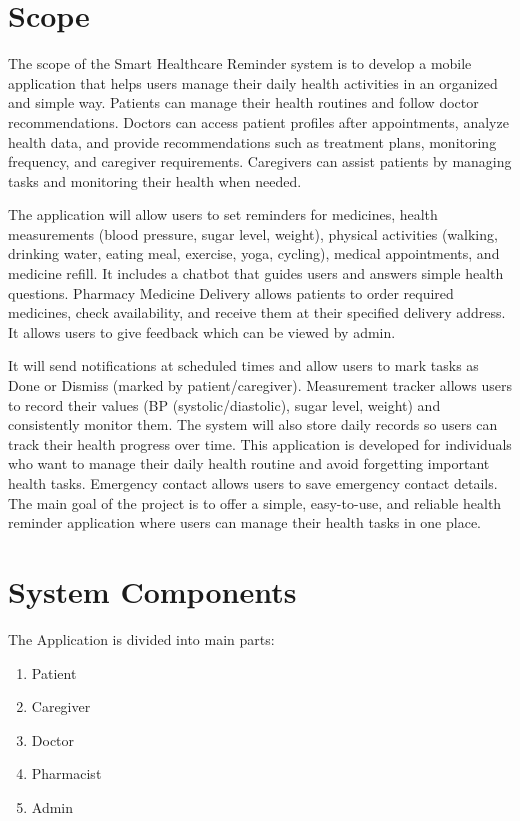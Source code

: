 \section{Scope}
\label{sec:scope}

The scope of the Smart Healthcare Reminder system is to develop a mobile application that helps users manage their daily health activities in an organized and simple way. Patients can manage their health routines and follow doctor recommendations. Doctors can access patient profiles after appointments, analyze health data, and provide recommendations such as treatment plans, monitoring frequency, and caregiver requirements. Caregivers can assist patients by managing tasks and monitoring their health when needed.

The application will allow users to set reminders for medicines, health measurements (blood pressure, sugar level, weight), physical activities (walking, drinking water, eating meal, exercise, yoga, cycling), medical appointments, and medicine refill. It includes a chatbot that guides users and answers simple health questions. Pharmacy Medicine Delivery allows patients to order required medicines, check availability, and receive them at their specified delivery address. It allows users to give feedback which can be viewed by admin.

It will send notifications at scheduled times and allow users to mark tasks as Done or Dismiss (marked by patient/caregiver). Measurement tracker allows users to record their values (BP (systolic/diastolic), sugar level, weight) and consistently monitor them. The system will also store daily records so users can track their health progress over time. This application is developed for individuals who want to manage their daily health routine and avoid forgetting important health tasks. Emergency contact allows users to save emergency contact details. The main goal of the project is to offer a simple, easy-to-use, and reliable health reminder application where users can manage their health tasks in one place.

\section{System Components}
\label{sec:system-components}

The Application is divided into main parts:
\begin{enumerate}
    \item Patient
    \item Caregiver
    \item Doctor
    \item Pharmacist
    \item Admin
\end{enumerate}


